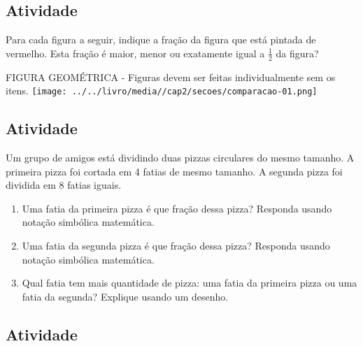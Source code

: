 \documentclass[a4,12pt]{book}
\begin{document}
\subsection{Atividade}







Para cada figura a seguir, indique a fração da figura que está pintada de vermelho. Esta fração é maior, menor ou exatamente igual a $\frac{1}{2}$ da figura?
\begin{imagem*}[breakable]{}{}   FIGURA GEOMÉTRICA - Figuras devem ser feitas individualmente sem os itens.  
    \texttt{[image: ../../livro/media//cap2/secoes/comparacao-01.png]}  
\end{imagem*}







\subsection{Atividade}







Um grupo de amigos está dividindo duas pizzas circulares do mesmo tamanho. A primeira pizza foi cortada em 4 fatias de mesmo tamanho. A segunda pizza foi dividida em 8 fatias iguais.

\begin{enumerate} [\quad a)] %
  \item     Uma fatia da primeira pizza é que fração dessa pizza? Responda usando notação simbólica matemática.
  \item     Uma fatia da segunda pizza é que fração dessa pizza? Responda usando notação simbólica matemática.
  \item     Qual fatia tem mais quantidade de pizza: uma fatia da primeira pizza ou uma fatia da segunda? Explique usando um desenho.
\end{enumerate} %









\subsection{Atividade}
\end{document}
